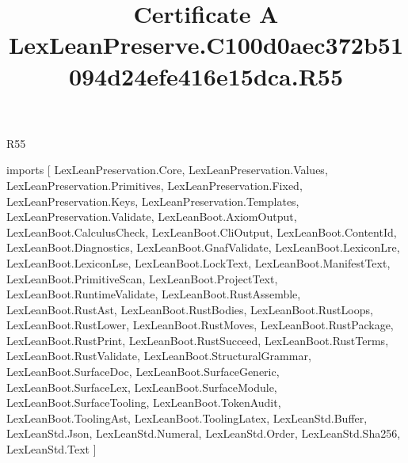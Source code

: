 \begin{lexlean}{R55}
\title{Certificate A LexLeanPreserve.C100d0aec372b51094d24efe416e15dca.R55}
\begin{coremodule}
imports [
  LexLeanPreservation.Core,
  LexLeanPreservation.Values,
  LexLeanPreservation.Primitives,
  LexLeanPreservation.Fixed,
  LexLeanPreservation.Keys,
  LexLeanPreservation.Templates,
  LexLeanPreservation.Validate,
  LexLeanBoot.AxiomOutput,
  LexLeanBoot.CalculusCheck,
  LexLeanBoot.CliOutput,
  LexLeanBoot.ContentId,
  LexLeanBoot.Diagnostics,
  LexLeanBoot.GnafValidate,
  LexLeanBoot.LexiconLre,
  LexLeanBoot.LexiconLse,
  LexLeanBoot.LockText,
  LexLeanBoot.ManifestText,
  LexLeanBoot.PrimitiveScan,
  LexLeanBoot.ProjectText,
  LexLeanBoot.RuntimeValidate,
  LexLeanBoot.RustAssemble,
  LexLeanBoot.RustAst,
  LexLeanBoot.RustBodies,
  LexLeanBoot.RustLoops,
  LexLeanBoot.RustLower,
  LexLeanBoot.RustMoves,
  LexLeanBoot.RustPackage,
  LexLeanBoot.RustPrint,
  LexLeanBoot.RustSucceed,
  LexLeanBoot.RustTerms,
  LexLeanBoot.RustValidate,
  LexLeanBoot.StructuralGrammar,
  LexLeanBoot.SurfaceDoc,
  LexLeanBoot.SurfaceGeneric,
  LexLeanBoot.SurfaceLex,
  LexLeanBoot.SurfaceModule,
  LexLeanBoot.SurfaceTooling,
  LexLeanBoot.TokenAudit,
  LexLeanBoot.ToolingAst,
  LexLeanBoot.ToolingLatex,
  LexLeanStd.Buffer,
  LexLeanStd.Json,
  LexLeanStd.Numeral,
  LexLeanStd.Order,
  LexLeanStd.Sha256,
  LexLeanStd.Text
]


\end{coremodule}
\end{lexlean}
